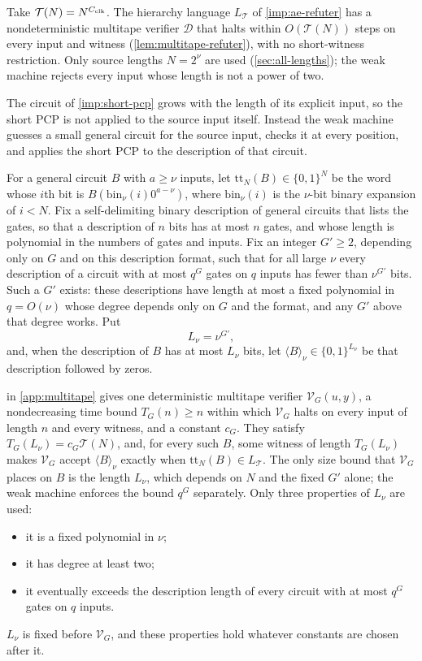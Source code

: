 \documentclass[11pt,letterpaper]{article}
\theoremstyle{definition}
\theoremstyle{remark}
\newcommand{\Tclk}{\mathcal T}
\begin{document}
Take $\Tclk(N)=N^{C_{\rm clk}}$. The hierarchy language
$L_{\Tclk}$ of \cref{imp:ae-refuter} has a nondeterministic multitape
verifier $\mathcal D$ that halts within $O(\Tclk(N))$ steps on every input and witness (\cref{lem:multitape-refuter}), with no short-witness
restriction. Only source lengths $N=2^\nu$ are used
(\cref{sec:all-lengths}); the weak machine rejects every input whose
length is not a power of two.

The circuit of \cref{imp:short-pcp} grows with the length of its
explicit input, so the short PCP is not applied to the source input
itself. Instead the weak machine guesses a small general circuit for
the source input, checks it at every position, and applies the short
PCP to the description of that circuit.

For a general circuit $B$ with
$a\ge\nu$ inputs, let $\mathrm{tt}_N(B)\in\{0,1\}^N$ be the word whose
$i$th bit is $B(\mathrm{bin}_\nu(i)0^{a-\nu})$, where
$\mathrm{bin}_\nu(i)$ is the $\nu$-bit binary expansion of $i<N$. Fix a
self-delimiting binary description of general circuits that lists the
gates, so that a description of $n$ bits has at most $n$ gates, and
whose length is polynomial in the numbers of gates and inputs. Fix an integer
$G'\ge2$, depending only on $G$ and on this description format, such
that for all large $\nu$ every description of a circuit with at most
$q^G$ gates on $q$ inputs has fewer than $\nu^{G'}$ bits. Such a $G'$
exists: these descriptions have length at most a fixed polynomial in
$q=O(\nu)$ whose degree depends only on $G$ and the format, and any $G'$
above that degree works. Put
\[
 L_\nu=\nu^{G'},
\]
and, when the description of $B$ has at most $L_\nu$ bits, let
$\langle B\rangle_\nu\in\{0,1\}^{L_\nu}$ be that description followed by
zeros.

 in \cref{app:multitape} gives one
deterministic multitape verifier $\mathcal V_G(u,y)$, a nondecreasing
time bound $T_G(n)\ge n$ within which $\mathcal V_G$ halts on every input
of length $n$ and every witness, and a constant $c_G$. They satisfy
$T_G(L_\nu)=c_G\Tclk(N)$, and, for every such $B$, some witness of length
$T_G(L_\nu)$ makes $\mathcal V_G$ accept $\langle B\rangle_\nu$ exactly
when $\mathrm{tt}_N(B)\in L_{\Tclk}$. The only size bound that
$\mathcal V_G$ places on $B$ is the length $L_\nu$, which depends on
$N$ and the fixed $G'$ alone; the weak machine enforces the bound $q^G$
separately. Only three properties of $L_\nu$ are used:
\begin{itemize}
\item it is a fixed polynomial in $\nu$;
\item it has degree at least two;
\item it eventually exceeds the description length of every circuit
with at most $q^G$ gates on $q$ inputs.
\end{itemize}
$L_\nu$ is fixed before $\mathcal V_G$, and these
properties hold whatever constants are chosen after it.
\end{document}
